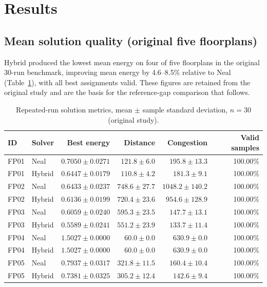 \documentclass[11pt]{article}
\begin{document}
\section{Results}

\subsection{Mean solution quality (original five floorplans)}
Hybrid produced the lowest mean energy on four of five floorplans in the original 30-run benchmark, improving mean energy by 4.6--8.5\% relative to Neal (Table~\ref{tab:meanquality}), with all best assignments valid. These figures are retained from the original study and are the basis for the reference-gap comparison that follows.

\begin{table}[h]
\centering
\caption{Repeated-run solution metrics, mean $\pm$ sample standard deviation, $n=30$ (original study).}
\label{tab:meanquality}
\small
\begin{tabular}{llrrrr}
\toprule
ID & Solver & Best energy & Distance & Congestion & Valid samples \\
\midrule
FP01 & Neal & $0.7050 \pm 0.0271$ & $121.8 \pm 6.0$ & $195.8 \pm 13.3$ & 100.00\% \\
FP01 & Hybrid & $0.6447 \pm 0.0179$ & $110.8 \pm 4.2$ & $181.3 \pm 9.1$ & 100.00\% \\
FP02 & Neal & $0.6433 \pm 0.0237$ & $748.6 \pm 27.7$ & $1048.2 \pm 140.2$ & 100.00\% \\
FP02 & Hybrid & $0.6136 \pm 0.0199$ & $720.4 \pm 23.6$ & $954.6 \pm 128.9$ & 100.00\% \\
FP03 & Neal & $0.6059 \pm 0.0240$ & $595.3 \pm 23.5$ & $147.7 \pm 13.1$ & 100.00\% \\
FP03 & Hybrid & $0.5589 \pm 0.0241$ & $551.2 \pm 23.9$ & $133.7 \pm 11.4$ & 100.00\% \\
FP04 & Neal & $1.5027 \pm 0.0000$ & $60.0 \pm 0.0$ & $630.9 \pm 0.0$ & 100.00\% \\
FP04 & Hybrid & $1.5027 \pm 0.0000$ & $60.0 \pm 0.0$ & $630.9 \pm 0.0$ & 100.00\% \\
FP05 & Neal & $0.7937 \pm 0.0317$ & $321.8 \pm 11.5$ & $160.4 \pm 10.4$ & 100.00\% \\
FP05 & Hybrid & $0.7381 \pm 0.0325$ & $305.2 \pm 12.4$ & $142.6 \pm 9.4$ & 100.00\% \\
\bottomrule
\end{tabular}
\end{table}
\end{document}
